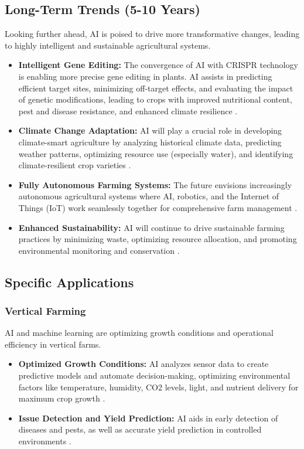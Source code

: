\subsection{Long-Term Trends (5-10 Years)}
Looking further ahead, AI is poised to drive more transformative changes, leading to highly intelligent and sustainable agricultural systems.
\begin{itemize}
    \item \textbf{Intelligent Gene Editing:} The convergence of AI with CRISPR technology is enabling more precise gene editing in plants. AI assists in predicting efficient target sites, minimizing off-target effects, and evaluating the impact of genetic modifications, leading to crops with improved nutritional content, pest and disease resistance, and enhanced climate resilience \cite{FrontiersIn_GeneEditing_1, GeneticLiteracyProject_GeneEditing}.
    \item \textbf{Climate Change Adaptation:} AI will play a crucial role in developing climate-smart agriculture by analyzing historical climate data, predicting weather patterns, optimizing resource use (especially water), and identifying climate-resilient crop varieties \cite{MedCraveOnline_FutureTrends, AccelAI_ClimateChange}.
    \item \textbf{Fully Autonomous Farming Systems:} The future envisions increasingly autonomous agricultural systems where AI, robotics, and the Internet of Things (IoT) work seamlessly together for comprehensive farm management \cite{Preprints_FutureTrends, NIH_AutonomousFarming}.
    \item \textbf{Enhanced Sustainability:} AI will continue to drive sustainable farming practices by minimizing waste, optimizing resource allocation, and promoting environmental monitoring and conservation \cite{EarthLab_Sustainability}.
\end{itemize}

\subsection{Specific Applications}

\subsubsection{Vertical Farming}
AI and machine learning are optimizing growth conditions and operational efficiency in vertical farms.
\begin{itemize}
    \item \textbf{Optimized Growth Conditions:} AI analyzes sensor data to create predictive models and automate decision-making, optimizing environmental factors like temperature, humidity, CO2 levels, light, and nutrient delivery for maximum crop growth \cite{VerticalMT_VerticalFarming, EasyFlow_VerticalFarming}.
    \item \textbf{Issue Detection and Yield Prediction:} AI aids in early detection of diseases and pests, as well as accurate yield prediction in controlled environments \cite{DevTo_VerticalFarming}.
\end{itemize}

